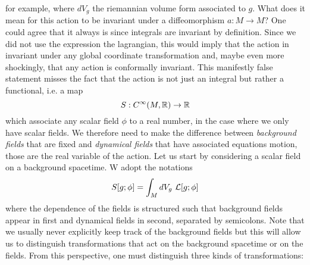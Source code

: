 \documentclass[a4paper,10pt]{article}
\begin{document}
    for example, where $dV_g$ the riemannian volume form associated to $g$. What does it mean for this action to be invariant under a diffeomorphism $a:M\to M$? One could agree that it always is since integrals are invariant by definition. Since we did not use the expression the lagrangian, this would imply that the action in invariant under any global coordinate transformation and, maybe even more shockingly, that any action is conformally invariant. This manifestly false statement misses the fact that the action is not just an integral but rather a functional, i.e. a map
    \begin{equation}
        S:C^\infty(M,\mathbb{R})\to\mathbb{R}
    \end{equation}
    which associate any scalar field $\phi$ to a real number, in the case where we only have scalar fields. We therefore need to make the difference between \emph{background fields} that are fixed and \emph{dynamical fields} that have associated equations motion, those are the real variable of the action. Let us start by considering a scalar field on a background spacetime. W adopt the notations
    \begin{equation}
        S[g;\phi]=\int_M dV_g~\mathcal{L}[g;\phi]
    \end{equation}
    where the dependence of the fields is structured such that background fields appear in first and dynamical fields in second, separated by semicolons. Note that we usually never explicitly keep track of the background fields but this will allow us to distinguish transformations that act on the background spacetime or on the fields. From this perspective, one must distinguish three kinds of transformations:
\end{document}
